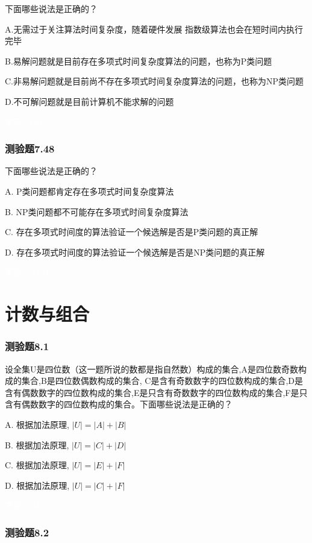 \documentclass[UTF8, heading=true]{ctexart}
\begin{document}
下面哪些说法是正确的？

A.无需过于关注算法时间复杂度，随着硬件发展
指数级算法也会在短时间内执行完毕

B.易解问题就是目前存在多项式时间复杂度算法的问题，也称为P类问题

C.非易解问题就是目前尚不存在多项式时间复杂度算法的问题，也称为NP类问题

D.不可解问题就是目前计算机不能求解的问题

\textcolor{white}{答案：BD}

\subsubsection{测验题7.48}

下面哪些说法是正确的？

A. P类问题都肯定存在多项式时间复杂度算法

B. NP类问题都不可能存在多项式时间复杂度算法

C. 存在多项式时间度的算法验证一个候选解是否是P类问题的真正解

D. 存在多项式时间度的算法验证一个候选解是否是NP类问题的真正解

\textcolor{white}{答案：ACD}

\clearpage
\section{计数与组合}

\subsubsection{测验题8.1}

设全集U是四位数（这一题所说的数都是指自然数）构成的集合,A是四位数奇数构成的集合,B是四位数偶数构成的集合,
C是含有奇数数字的四位数构成的集合,D是含有偶数数字的四位数构成的集合,E是只含有奇数数字的四位数构成的集合,F是只含有偶数数字的四位数构成的集合。下面哪些说法是正确的？

A. 根据加法原理, $|U|=|A|+|B|$

B. 根据加法原理, $|U|=|C|+|D|$

C. 根据加法原理, $|U|=|E|+|F|$

D. 根据加法原理, $|U|=|C|+|F|$

\textcolor{white}{答案：AD}

\subsubsection{测验题8.2}
\end{document}
